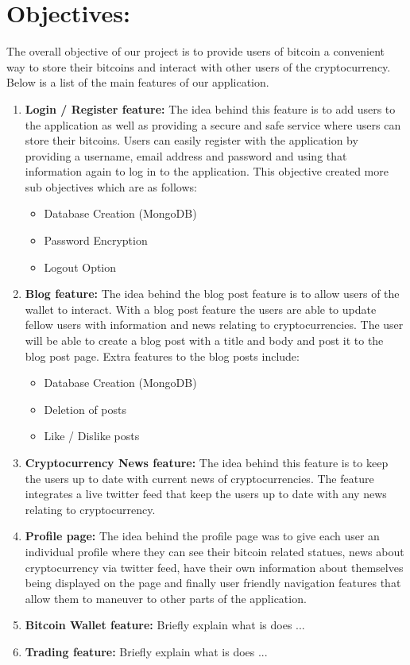 \section{Objectives:}
The overall objective of our project is to provide users of bitcoin a convenient way to store their bitcoins and interact with other users of the cryptocurrency. Below is a list of the main features of our application.

\begin{enumerate}

\item \textbf{Login / Register feature:}
The idea behind this feature is to add users to the application as well as providing a secure and safe service where users can store their bitcoins. Users can easily register with the application by providing a username, email address and password and using that information again to log in to the application. This objective created more sub objectives which are as follows:
    \begin{itemize}
        \item Database Creation (MongoDB)
        \item Password Encryption
        \item Logout Option
    \end{itemize}

\item \textbf{Blog feature:}
The idea behind the blog post feature is to allow users of the wallet to interact. With a blog post feature the users are able to update fellow users with information and news relating to cryptocurrencies. The user will be able to create a blog post with a title and body and post it to the blog post page. Extra features to the blog posts include:
    \begin{itemize}
        \item Database Creation (MongoDB)
        \item Deletion of posts
        \item Like / Dislike posts
    \end{itemize}

\item \textbf{Cryptocurrency News feature:}
The idea behind this feature is to keep the users up to date with current news of cryptocurrencies. The feature integrates a live twitter feed that keep the users up to date with any news relating to cryptocurrency.

\item \textbf{Profile page:}
The idea behind the profile page was to give each user an individual profile where they can see their bitcoin related statues, news about cryptocurrency via twitter feed, have their own information about themselves being displayed on the page and finally user friendly navigation features that allow them to maneuver to other parts of the application. 

\item \textbf{Bitcoin Wallet feature:}
Briefly explain what is does ...

\item \textbf{Trading feature:}
Briefly explain what is does ...

\end{enumerate}

